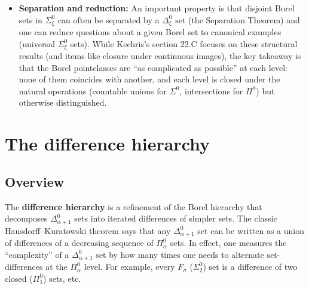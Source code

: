 \documentclass[11pt]{article}
\begin{document}
\begin{itemize}
\item \textbf{Separation and reduction:} An important property is that disjoint
Borel sets in \(\Sigma^0_\xi\) can often be separated by a
\(\Delta^0_\xi\) set (the Separation Theorem) and one can reduce
questions about a given Borel set to canonical examples (universal
\(\Sigma^0_\xi\) sets). While Kechris's section 22.C focuses on these
structural results (and items like closure under continuous images),
the key takeaway is that the Borel pointclasses are “as complicated as
possible” at each level: none of them coincides with another, and each
level is closed under the natural operations (countable unions for
\(\Sigma^0\), intersections for \(\Pi^0\)) but otherwise
distinguished.
\end{itemize}
\section{The difference hierarchy}
\label{the-difference-hierarchy}
\subsection{Overview}
\label{overview-6}
The \textbf{difference hierarchy} is a refinement of the Borel hierarchy that
decomposes \(\Delta^0_{\alpha+1}\) sets into iterated differences of
simpler sets. The classic Hausdorff--Kuratowski theorem says that any
\(\Delta^0_{\alpha+1}\) set can be written as a union of differences of
a decreasing sequence of \(\Pi^0_\alpha\) sets. In effect, one measures
the “complexity” of a \(\Delta^0_{\alpha+1}\) set by how many times one
needs to alternate set-differences at the \(\Pi^0_\alpha\) level. For
example, every \(F_\sigma\) (\(\Sigma^0_2\)) set is a difference of two
closed (\(\Pi^0_1\)) sets, etc.
\end{document}
